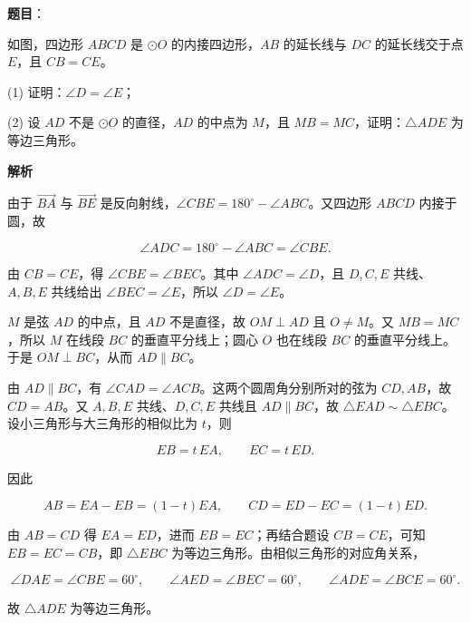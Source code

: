 \begin{answer}

\textbf{题目}：

如图，四边形 $ABCD$ 是 $\odot O$ 的内接四边形，$AB$ 的延长线与 $DC$ 的延长线交于点 $E$，且 $CB=CE$。
\nopagebreak[4]
\begin{center}\end{center}
\nopagebreak[4]
(1) 证明：$\angle D=\angle E$；

(2) 设 $AD$ 不是 $\odot O$ 的直径，$AD$ 的中点为 $M$，且 $MB=MC$，证明：$\triangle ADE$ 为等边三角形。

\textbf{解析}


由于 $\overrightarrow{BA}$ 与 $\overrightarrow{BE}$ 是反向射线，$\angle CBE=180^\circ-\angle ABC$。又四边形 $ABCD$ 内接于圆，故

\nopagebreak[4]
\[
\angle ADC=180^\circ-\angle ABC=\angle CBE.
\]

由 $CB=CE$，得 $\angle CBE=\angle BEC$。其中 $\angle ADC=\angle D$，且 $D,C,E$ 共线、$A,B,E$ 共线给出 $\angle BEC=\angle E$，所以 $\angle D=\angle E$。


$M$ 是弦 $AD$ 的中点，且 $AD$ 不是直径，故 $OM\perp AD$ 且 $O\ne M$。又 $MB=MC$，所以 $M$ 在线段 $BC$ 的垂直平分线上；圆心 $O$ 也在线段 $BC$ 的垂直平分线上。于是 $OM\perp BC$，从而 $AD\parallel BC$。

由 $AD\parallel BC$，有 $\angle CAD=\angle ACB$。这两个圆周角分别所对的弦为 $CD,AB$，故 $CD=AB$。又 $A,B,E$ 共线、$D,C,E$ 共线且 $AD\parallel BC$，故 $\triangle EAD\sim\triangle EBC$。设小三角形与大三角形的相似比为 $t$，则

\nopagebreak[4]
\[
EB=t\,EA,\qquad EC=t\,ED.
\]

因此

\nopagebreak[4]
\[
AB=EA-EB=(1-t)EA,\qquad CD=ED-EC=(1-t)ED.
\]

由 $AB=CD$ 得 $EA=ED$，进而 $EB=EC$；再结合题设 $CB=CE$，可知 $EB=EC=CB$，即 $\triangle EBC$ 为等边三角形。由相似三角形的对应角关系，

\nopagebreak[4]
\[
\angle DAE=\angle CBE=60^\circ,\qquad
\angle AED=\angle BEC=60^\circ,\qquad
\angle ADE=\angle BCE=60^\circ.
\]

故 $\triangle ADE$ 为等边三角形。



\end{answer}
